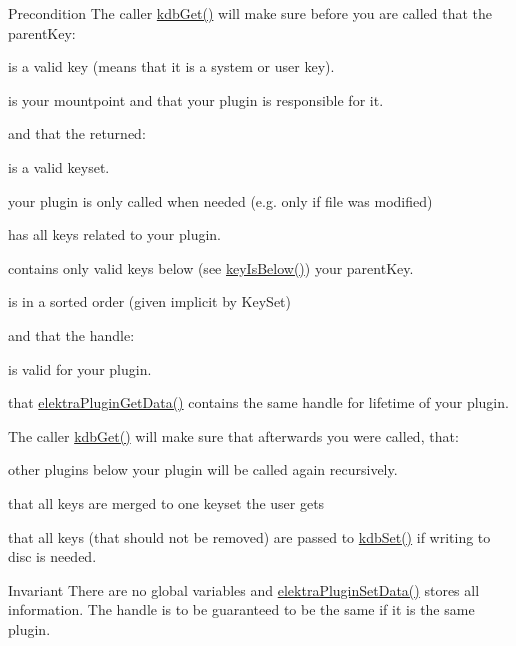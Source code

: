 \begin{DoxyPrecond}{Precondition}
The caller \mbox{\hyperlink{group__kdb_ga28e385fd9cb7ccfe0b2f1ed2f62453a1}{kdb\+Get()}} will make sure before you are called that the parent\+Key\+:
\begin{DoxyItemize}
\item is a valid key (means that it is a system or user key).
\item is your mountpoint and that your plugin is responsible for it. 
\end{DoxyItemize}

and that the returned\+:
\begin{DoxyItemize}
\item is a valid keyset.
\item your plugin is only called when needed (e.\+g. only if file was modified)
\item has {\ttfamily all} keys related to your plugin.
\item contains only valid keys below (see \mbox{\hyperlink{group__keytest_ga03332b5d97c76a4fd2640aca4762b8df}{key\+Is\+Below()}}) your parent\+Key.
\item is in a sorted order (given implicit by Key\+Set) 
\end{DoxyItemize}

and that the handle\+:
\begin{DoxyItemize}
\item is valid for your plugin.
\item that \mbox{\hyperlink{group__plugin_gaafcf3216b46292f222b8cc7828b4dd20}{elektra\+Plugin\+Get\+Data()}} contains the same handle for lifetime of your plugin.
\end{DoxyItemize}

The caller \mbox{\hyperlink{group__kdb_ga28e385fd9cb7ccfe0b2f1ed2f62453a1}{kdb\+Get()}} will make sure that afterwards you were called, that\+:
\begin{DoxyItemize}
\item other plugins below your plugin will be called again recursively.
\item that all keys are merged to one keyset the user gets
\item that all keys (that should not be removed) are passed to \mbox{\hyperlink{group__kdb_ga11436b058408f83d303ca5e996832bcf}{kdb\+Set()}} if writing to disc is needed.
\end{DoxyItemize}
\end{DoxyPrecond}
\begin{DoxyInvariant}{Invariant}
There are no global variables and \mbox{\hyperlink{group__plugin_gaf4b941a52ff55d0ca2a9158d90208ef2}{elektra\+Plugin\+Set\+Data()}} stores all information. The handle is to be guaranteed to be the same if it is the same plugin.
\end{DoxyInvariant}

